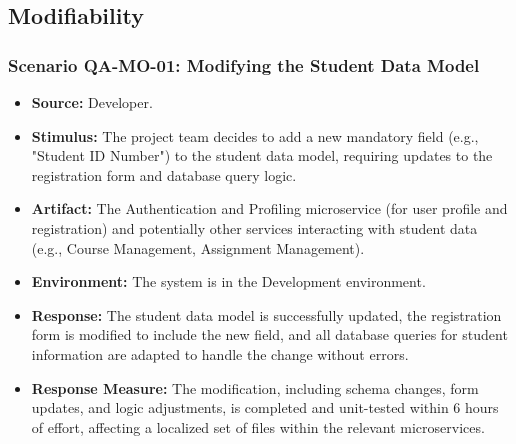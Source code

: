 \subsection{Modifiability}

\subsubsection{Scenario QA-MO-01: Modifying the Student Data Model}
\begin{itemize}
    \item \textbf{Source:} Developer.
    \item \textbf{Stimulus:} The project team decides to add a new mandatory field (e.g., "Student ID Number") to the student data model, requiring updates to the registration form and database query logic.
    \item \textbf{Artifact:} The Authentication and Profiling microservice (for user profile and registration) and potentially other services interacting with student data (e.g., Course Management, Assignment Management).
    \item \textbf{Environment:} The system is in the Development environment.
    \item \textbf{Response:} The student data model is successfully updated, the registration form is modified to include the new field, and all database queries for student information are adapted to handle the change without errors.
    \item \textbf{Response Measure:} The modification, including schema changes, form updates, and logic adjustments, is completed and unit-tested within 6 hours of effort, affecting a localized set of files within the relevant microservices.
\end{itemize}

